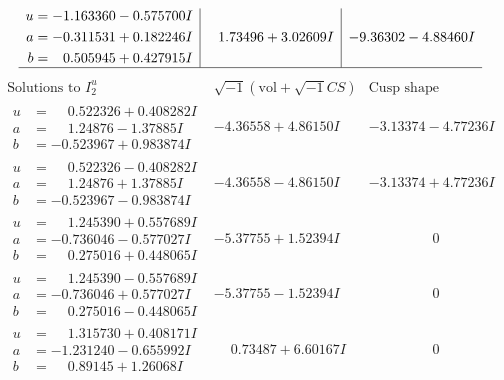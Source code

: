 \documentclass[1p]{elsarticle_modified}
\theoremstyle{definition}
\newcommand{\I}{\sqrt{-1}}
\begin{document}
$$\begin{array}{c|c|c}
\begin{aligned}
u &= -1.163360 - 0.575700 I \\
a &= -0.311531 + 0.182246 I \\
b &= \phantom{-}0.505945 + 0.427915 I\end{aligned}
 & \phantom{-}1.73496 + 3.02609 I & -9.36302 - 4.88460 I\\
 \hline 
 \end{array}$$\newpage$$\begin{array}{c|c|c}  
\text{Solutions to }I^u_{2}& \I (\text{vol} + \sqrt{-1}CS) & \text{Cusp shape}\\
 \hline 
\begin{aligned}
u &= \phantom{-}0.522326 + 0.408282 I \\
a &= \phantom{-}1.24876 - 1.37885 I \\
b &= -0.523967 + 0.983874 I\end{aligned}
 & -4.36558 + 4.86150 I & -3.13374 - 4.77236 I \\ \hline\begin{aligned}
u &= \phantom{-}0.522326 - 0.408282 I \\
a &= \phantom{-}1.24876 + 1.37885 I \\
b &= -0.523967 - 0.983874 I\end{aligned}
 & -4.36558 - 4.86150 I & -3.13374 + 4.77236 I \\ \hline\begin{aligned}
u &= \phantom{-}1.245390 + 0.557689 I \\
a &= -0.736046 - 0.577027 I \\
b &= \phantom{-}0.275016 + 0.448065 I\end{aligned}
 & -5.37755 + 1.52394 I & \phantom{-0.000000 } 0 \\ \hline\begin{aligned}
u &= \phantom{-}1.245390 - 0.557689 I \\
a &= -0.736046 + 0.577027 I \\
b &= \phantom{-}0.275016 - 0.448065 I\end{aligned}
 & -5.37755 - 1.52394 I & \phantom{-0.000000 } 0 \\ \hline\begin{aligned}
u &= \phantom{-}1.315730 + 0.408171 I \\
a &= -1.231240 - 0.655992 I \\
b &= \phantom{-}0.89145 + 1.26068 I\end{aligned}
 & \phantom{-}0.73487 + 6.60167 I & \phantom{-0.000000 } 0 \\ \hline\begin{aligned}

\end{aligned}
\end{array}$$
\end{document}
